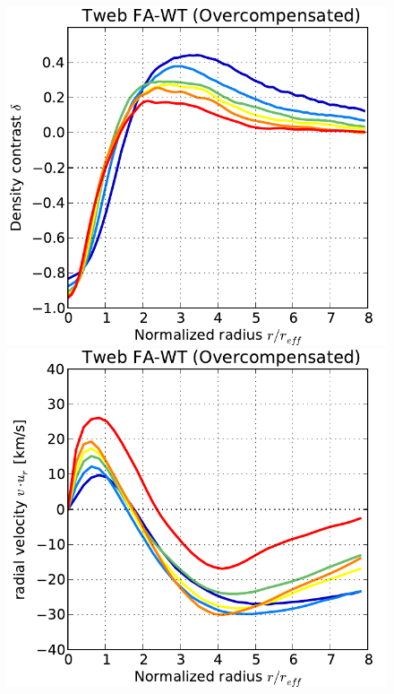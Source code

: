 \documentclass[a4,useAMS,usenatbib,usegraphicx]{mn2e}
\begin{document}
\begin{figure}
  \includegraphics[trim = 1mm 0mm 5mm 0mm, clip, keepaspectratio=true,
  width=0.24\textheight]{voids_density_TwebFAG1.pdf}
  \includegraphics[trim = 1mm 0mm 5mm 0mm, clip, keepaspectratio=true,
  width=0.24\textheight]{voids_velocity_TwebFAG1.pdf}

\end{figure}
\end{document}
